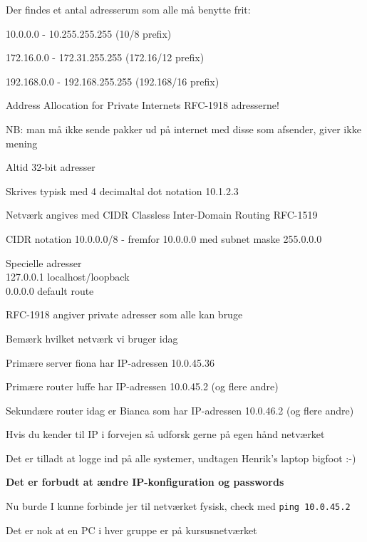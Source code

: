 
\begin{list1}
\item Der findes et antal adresserum som alle må benytte frit:
\begin{list2}
\item 10.0.0.0    -  10.255.255.255  (10/8 prefix)
\item 172.16.0.0  -  172.31.255.255  (172.16/12 prefix)
\item 192.168.0.0 -  192.168.255.255 (192.168/16 prefix)
\end{list2}
\item Address Allocation for Private Internets RFC-1918 adresserne!
\item NB: man må ikke sende pakker ud på internet med disse som afsender, giver ikke mening
\end{list1}


\begin{list2}
\item Altid 32-bit adresser
\item Skrives typisk med 4 decimaltal dot notation 10.1.2.3
\item Netværk angives med CIDR Classless Inter-Domain Routing RFC-1519
\item CIDR notation 10.0.0.0/8 -
  fremfor 10.0.0.0 med subnet maske 255.0.0.0
\item Specielle adresser\\
127.0.0.1 localhost/loopback\\
0.0.0.0  default route
\item RFC-1918 angiver private adresser som alle kan bruge

\end{list2}



\begin{list1}
\item Bemærk hvilket netværk vi bruger idag
\item Primære server fiona har IP-adressen 10.0.45.36
\item Primære router luffe har IP-adressen 10.0.45.2 (og flere andre)
\item Sekundære router idag er Bianca som har IP-adressen 10.0.46.2 (og flere andre)  
\item Hvis du kender til IP i forvejen så udforsk gerne på egen hånd netværket
\item Det er tilladt at logge ind på alle systemer, undtagen Henrik's laptop bigfoot :-)
\item {\bf Det er forbudt at ændre IP-konfiguration og passwords}
\item Nu burde I kunne forbinde jer til netværket fysisk, check med \verb+ping 10.0.45.2+
\item Det er nok at en PC i hver gruppe er på kursusnetværket
\end{list1}

